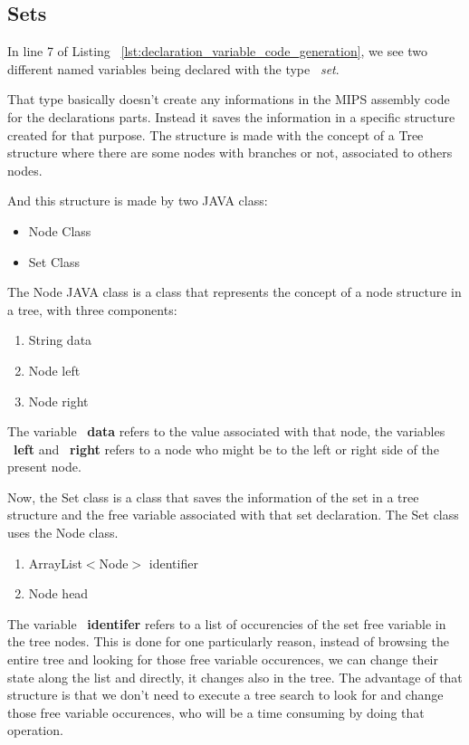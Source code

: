 \documentclass[
  oneside,
  11pt, a4paper,
  footinclude=true,
  headinclude=true,
  cleardoublepage=empty
]{scrbook}
\begin{document}
\subsection*{Sets}

In line 7 of Listing ~\ref{lst:declaration_variable_code_generation}, we see two different named variables being declared with the type ~\textit{set}.

That type basically doesn't create any informations in the MIPS assembly code for the declarations parts. Instead it saves the information in a specific structure created for that purpose. The structure is made with the concept of a Tree structure where there are some nodes with branches or not, associated to others nodes.

And this structure is made by two JAVA class:

\begin{itemize}
\item Node Class
\item Set Class
\end{itemize}

The Node JAVA class is a class that represents the concept of a node structure in a tree, with three components:
\begin{enumerate}
\item String data 
\item Node left
\item Node right
\end{enumerate}

The variable ~\textbf{data} refers to the value associated with that node, the variables ~\textbf{left} and ~\textbf{right} refers to a node who might be to the left or right side of the present node.

Now, the Set class is a class that saves the information of the set in a tree structure and the free variable associated with that set declaration. The Set class uses the Node class.

\begin{enumerate}
\item ArrayList$<$Node$>$ identifier
\item Node head
\end{enumerate}

The variable ~\textbf{identifer} refers to a list of occurencies of the set free variable in the tree nodes. This is done for one particularly reason, instead of browsing the entire tree and looking for those free variable occurences, we can change their state along the list and directly, it changes also in the tree. The advantage of that structure is that we don't need to execute a tree search to look for  and change those free variable occurences, who will be  a time consuming by doing that operation.
\end{document}

